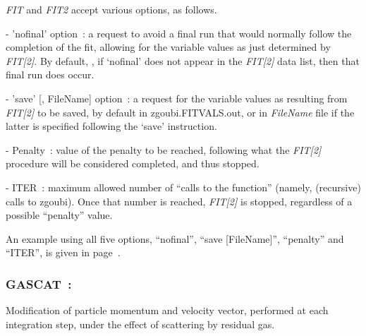 {\noindent \textsl{FIT} and \textsl{FIT2} accept various options, as follows. 

\smallskip

\noindent - 'nofinal' option~: \label{nofinal}
a request to avoid a final run that would normally follow the completion of the fit, allowing for the 
variable values as just determined by \textsl{FIT[2]}. By default, \ie, if `nofinal' does 
not appear in the   \textsl{FIT[2]} data list, then that final run does occur. 

\smallskip



\noindent - 'save' [, FileName] option~:  a request for the variable values as resulting from  \textsl{FIT[2]} to be saved, by 
default in zgoubi.FITVALS.out, or in \textsl{FileName} file if the latter is specified following the `save' instruction.

\smallskip

\noindent - Penalty~: value of the penalty to be reached, following what the  \textsl{FIT[2]} procedure 
will be considered completed, and thus  stopped. 

\smallskip

\noindent - ITER~: maximum allowed number of ``calls to the function'' (namely, (recursive) calls to zgoubi). Once that number is reached, 
 \textsl{FIT[2]} is stopped, regardless of a possible ``penalty'' value. 

\medskip

\noindent An example using all five options, ``nofinal'', ``save [FileName]'', ``penalty'' and ``ITER'', 
is given in page~\pageref{FITOptionsExa}. 








\newpage

\subsubsection{GASCAT~: \GASCATTitl} \label{GASCAT}
\medskip

Modification of particle momentum and velocity vector, performed at each integration step, 
under the effect of scattering by residual gas.

\bigskip




}
